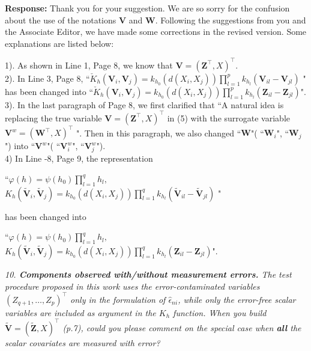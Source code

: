 \documentclass[12pt]{report}
\begin{document}
\begin{description}
{ \bf Response: } Thank you for your suggestion. We are so sorry for the
confusion about the use of the notations $\mathbf{V}$ and $\mathbf{W}$.  Following the suggestions from you and
the Associate Editor, we have made some corrections in the revised version. Some explanations are listed below:

1).  As shown in Line 1, Page 8, we know that $\mathbf{V}=(\mathbf{Z}^\top,X)^\top.$\\

2). In Line 3, Page 8, ``$\check{K}_{h}(\mathbf{V}_{i},\mathbf{V}_{j})=k_{h_{0}}(d(X_{i},X_{j}))\displaystyle\prod_{l=1}^{p}k_{h_{l}}(\mathbf{V}_{il}-\mathbf{V}_{jl})$ " has been changed into ``$\check{K}_{h}(\mathbf{V}_{i},\mathbf{V}_{j})=k_{h_{0}}(d(X_{i},X_{j}))\displaystyle\prod_{l=1}^{p}k_{h_{l}}(\mathbf{Z}_{il}-\mathbf{Z}_{jl})$".\\

3). In the last paragraph of Page 8, we first clarified that ``A natural idea is replacing  the true variable $\mathbf{V}=(\mathbf{Z}^\top,X)^\top$ in (5) with the surrogate variable $\mathbf{V}^{w}=(\mathbf{W}^{\top},X)^{\top}$ ". Then in this paragraph, we also changed ``$\mathbf{W}$"( ``$\mathbf{W}_i$", ``$\mathbf{W}_j$") into ``$\mathbf{V}^{w}$"( ``$\mathbf{V}^{w}_i$", ``$\mathbf{V}^{w}_j$").\\

4) In Line -8, Page 9, the representation

\begin{center}
``$\varphi(h)=\psi(h_0)\displaystyle\prod_{l=1}^{q}h_{l},$ $K_{h}(\mathbf{\tilde{V}}_{i},\mathbf{\tilde{V}}_{j})=k_{h_{0}}(d(X_{i},X_{j}))\displaystyle\prod_{l=1}^{q}k_{h_{l}}(\mathbf{\tilde{V}}_{il}-\mathbf{\tilde{V}}_{jl})$ "
\end{center}

 has been changed into

 \begin{center}
 ``$\varphi(h)=\psi(h_0)\displaystyle\prod_{l=1}^{q}h_{l},$ $K_{h}(\mathbf{\tilde{V}}_{i},\mathbf{\tilde{V}}_{j})=k_{h_{0}}(d(X_{i},X_{j}))\displaystyle\prod_{l=1}^{q}k_{h_{l}}(\mathbf{Z}_{il}-\mathbf{Z}_{jl})$".
 \end{center}

\item {{ \textcolor[rgb]{0.00,0.50,1.00}{\em 10.  {\bf {Components observed with/without measurement errors.}} The test procedure proposed
in this work uses the error-contaminated variables $(Z_{q+1},\ldots,Z_p)^{\top}$ only in the formulation
of $\hat{\epsilon}_{ni}$, while only the error-free scalar variables are included as argument in the $K_h$
function. When you build $\tilde{\mathbf{V}}=(\tilde{\mathbf{Z}},X)^{\top}$ (p.7), could you please comment on the special case
when {\bf{all}} the scalar covariates are measured with error?}}}\\


\end{description}
\end{document}
